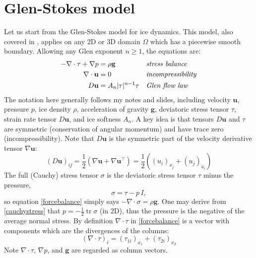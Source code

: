 \documentclass[letterpaper,final,12pt,reqno]{amsart}
\newcommand{\grad}{\nabla}
\newcommand{\Div}{\nabla\cdot}
\newcommand{\trace}{\operatorname{tr}}
\newcommand{\bg}{\mathbf{g}}
\newcommand{\bu}{\mathbf{u}}
\begin{document}
\section{Glen-Stokes model} \label{sec:stokes}

Let us start from the Glen-Stokes model for ice dynamics.  This model, also covered in \cite{GreveBlatter2009,JouvetRappaz2011}, applies on any 2D or 3D domain $\Omega$ which has a piecewise smooth boundary.  Allowing any Glen exponent $n\ge 1$, the equations are:
\begin{align}
- \nabla \cdot \tau + \nabla p &= \rho \bg &&\text{\emph{stress balance}} \label{forcebalance} \\
\nabla \cdot \bu &= 0 &&\text{\emph{incompressibility}} \label{incompressible} \\
D\bu &= A_n |\tau|^{n-1} \tau &&\text{\emph{Glen flow law}} \label{flowlaw}
\end{align}
The notation here generally follows my notes and slides, including velocity $\bu$, pressure $p$, ice density $\rho$, acceleration of gravity $\bg$, deviatoric stress tensor $\tau$, strain rate tensor $D\bu$, and ice softness $A_n$.  A key idea is that tensors $D\bu$ and $\tau$ are symmetric (conservation of angular momentum) and have trace zero (incompressibility).  Note that $D\bu$ is the symmetric part of the velocity derivative tensor $\grad \bu$:
\begin{equation}
(D\bu)_{ij} = \frac{1}{2} \left(\grad\bu + \grad\bu^\top\right) = \frac{1}{2} \left((u_i)_{x_j} + (u_j)_{x_i}\right) \label{strainrate}
\end{equation}
The full (Cauchy) stress tensor $\sigma$ is the deviatoric stress tensor $\tau$ minus the pressure,
\begin{equation}
    \sigma = \tau - p\,I,  \label{cauchystress}
\end{equation}
so equation \eqref{forcebalance} simply says $-\Div \sigma = \rho \bg$.  One may derive from \eqref{cauchystress} that $p = -\frac{1}{2} \trace \sigma$ (in 2D), thus the pressure is the negative of the average normal stress.  By definition $\Div\tau$ in \eqref{forcebalance} is a vector with components which are the divergences of the columns:
\begin{equation}
    \left(\nabla \cdot \tau\right)_i = \left(\tau_{1i}\right)_{x_1} + \left(\tau_{2i}\right)_{x_2}  \label{divtaudefn}
\end{equation}
Note $\nabla\cdot \tau$, $\nabla p$, and $\bg$ are regarded as column vectors.
\end{document}
